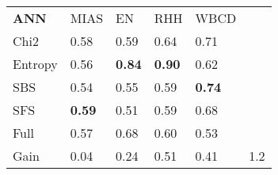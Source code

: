 \begin{tabular}{|l|l|l|l|l|l}
\cline{1-5}
        \textbf{ANN} & MIAS              & EN                & RHH               & WBCD      &         \\
\cline{1-5}
Chi2    & 0.58 & 0.59 & 0.64 & 0.71 \\
Entropy & 0.56 & \textbf{0.84} & \textbf{0.90} & 0.62 \\
SBS     & 0.54 & 0.55 & 0.59 & \textbf{0.74} \\
SFS     & \textbf{0.59} & 0.51 & 0.59 & 0.68 \\
Full    & 0.57 & 0.68 & 0.60 & 0.53 \\
\cline{1-5}
Gain    & 0.04 & 0.24 & 0.51 & 0.41 & 1.2 \\
\cline{1-5}
\end{tabular}
